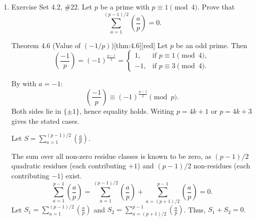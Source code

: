 \begin{enumerate}
\begin{enumerate}
\begin{subprove}
\[      \]
      It must be shown that $\frac{(p^2-1)(3p^2-7)}{120}$ is an integer.
      Since $p>5$, $p$ is prime to 2, 3, and 5.
      \begin{itemize}
        \item By part (a), $p^2-1$ is divisible by 24.
        \item By Fermat's Little Theorem, $p^2 \equiv \pm 1 \pmod 5$.
        \begin{itemize}
          \item If $p^2 \equiv 1 \pmod 5$, then $p^2-1$ is divisible by 5.
          \item If $p^2 \equiv -1 \pmod 5$, then $3p^2-7 \equiv 3(-1)-7 = -10 \equiv 0 \pmod 5$.
        \end{itemize}
        In either case, the numerator is divisible by 5.
      \end{itemize}
      Since $\gcd(24, 5)=1$, the numerator is divisible by $24 \cdot 5 = 120$.
      Thus, $S_{QR} = p \cdot (\text{integer})$, so $S_{QR} \equiv 0 \pmod p$.
      Therefore, $S_{QNR} = S_{ALL} - S_{QR} \equiv 0 - 0 \equiv 0 \pmod p$.
    \end{subprove}
  \end{enumerate}
  
  \newpage
  \item Exercise Set 4.2, \#22. Let $p$ be a prime with $p\equiv 1\pmod{4}$. Prove that
  \[
    \sum_{a=1}^{(p-1)/2}\left(\frac{a}{p}\right)=0.
  \]
  \begin{define}{Theorem 4.6 (Value of $(-1/p)$)}[thm:4.6][red]
  Let $p$ be an odd prime. Then
  \[
  \left(\frac{-1}{p}\right)=(-1)^{\frac{p-1}{2}}=
  \begin{cases}
  1, & \text{if } p\equiv 1\pmod 4,\\[4pt]
  -1,& \text{if } p\equiv 3\pmod 4.
  \end{cases}
  \]
  \begin{subprove}
  By  with $a=-1$:
  \[
  \left(\frac{-1}{p}\right)\equiv (-1)^{\frac{p-1}{2}}\pmod p.
  \]
  Both sides lie in $\{\pm1\}$, hence equality holds. Writing $p=4k+1$ or $p=4k+3$ gives the stated cases.
  \end{subprove}
  \end{define}
  \begin{subprove}
    Let $S = \sum_{a=1}^{(p-1)/2}\left(\frac{a}{p}\right)$.
    
    The sum over all non-zero residue classes is known to be zero, as $(p-1)/2$ quadratic residues (each contributing $+1$) and $(p-1)/2$ non-residues (each contributing $-1$) exist.
    \[
      \sum_{a=1}^{p-1}\left(\frac{a}{p}\right) = \sum_{a=1}^{(p-1)/2}\left(\frac{a}{p}\right) + \sum_{a=(p+1)/2}^{p-1}\left(\frac{a}{p}\right) = 0.
    \]
    Let $S_1 = \sum_{a=1}^{(p-1)/2}\left(\frac{a}{p}\right)$ and $S_2 = \sum_{a=(p+1)/2}^{p-1}\left(\frac{a}{p}\right)$. Thus, $S_1 + S_2 = 0$.


\end{subprove}
\end{enumerate}
